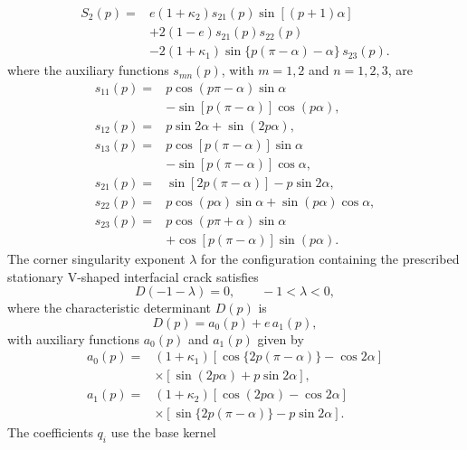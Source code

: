 \documentclass[pdflatex,iicol,sn-mathphys-ay]{sn-jnl}
\begin{document}
\begin{appendices}
{\begin{equation*}
\begin{aligned}
  S_2(p)={}&e(1+\kappa_2)s_{21}(p)
  \sin[(p+1)\alpha]\\
  &+2(1-e)s_{21}(p)s_{22}(p)\\
  &-2(1+\kappa_1)
  \sin\{p(\pi-\alpha)-\alpha\}\,s_{23}(p).
\end{aligned}
\end{equation*}
}
where the auxiliary functions $s_{mn}(p)$, with $m=1,2$ and
$n=1,2,3$, are
{\small
\begin{equation*}
\begin{aligned}
  s_{11}(p)={}&p\cos(p\pi-\alpha)\sin\alpha\\
             &-\sin[p(\pi-\alpha)]\cos(p\alpha),\\
  s_{12}(p)={}&p\sin2\alpha+\sin(2p\alpha),\\
  s_{13}(p)={}&p\cos[p(\pi-\alpha)]\sin\alpha\\
             &-\sin[p(\pi-\alpha)]\cos\alpha,\\
  s_{21}(p)={}&\sin[2p(\pi-\alpha)]-p\sin2\alpha,\\
  s_{22}(p)={}&p\cos(p\alpha)\sin\alpha
             +\sin(p\alpha)\cos\alpha,\\
  s_{23}(p)={}&p\cos(p\pi+\alpha)\sin\alpha\\
             &+\cos[p(\pi-\alpha)]\sin(p\alpha).
\end{aligned}
\end{equation*}
}
The corner singularity exponent $\lambda$ for the configuration
containing the prescribed stationary V-shaped interfacial crack satisfies
\begin{equation}
\label{eq:app-D-root}
  D(-1-\lambda)=0,
  \qquad -1<\lambda<0,
\end{equation}
where the characteristic determinant $D(p)$ is
\begin{equation*}
  D(p)=a_0(p)+e\,a_1(p),
\end{equation*}
with auxiliary functions $a_0(p)$ and $a_1(p)$ given by
{\small
\begin{equation*}
\begin{aligned}
  a_0(p)={}&(1+\kappa_1)
  [\cos\{2p(\pi-\alpha)\}-\cos2\alpha]\\
  &\times[\sin(2p\alpha)+p\sin2\alpha],\\
  a_1(p)={}&(1+\kappa_2)
  [\cos(2p\alpha)-\cos2\alpha]\\
  &\times[\sin\{2p(\pi-\alpha)\}-p\sin2\alpha].
\end{aligned}
\end{equation*}
}
The coefficients $q_i$ use the base kernel

\end{appendices}
\end{document}

